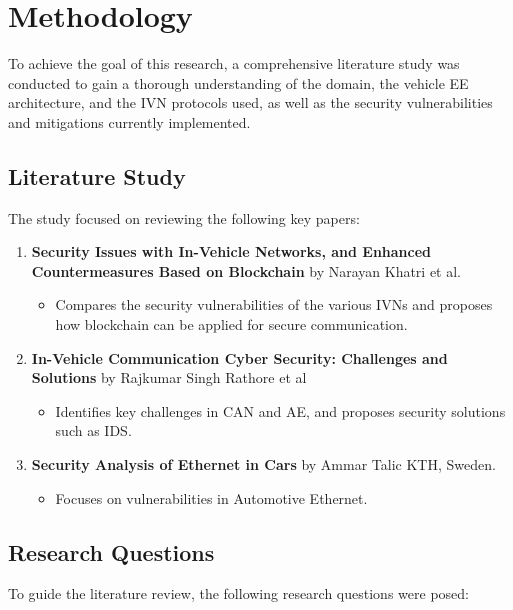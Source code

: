 \documentclass{report}
\begin{document}
\section{Methodology}
To achieve the goal of this research, a comprehensive literature study was conducted to gain a thorough understanding of the domain, the vehicle EE architecture, and the IVN protocols used, as well as the security vulnerabilities and mitigations currently implemented.

\subsection{Literature Study}
The study focused on reviewing the following key papers:

\begin{enumerate}
    \item \textbf{Security Issues with In-Vehicle Networks, and Enhanced Countermeasures Based on Blockchain} by Narayan Khatri et al.
    \begin{itemize}
        \item Compares the security vulnerabilities of the various IVNs and proposes how blockchain can be applied for secure communication.
    \end{itemize}
    \item \textbf{In-Vehicle Communication Cyber Security: Challenges and Solutions} by Rajkumar Singh Rathore et al
    \begin{itemize}
        \item Identifies key challenges in CAN and AE, and proposes security solutions such as IDS.
    \end{itemize}
    \item \textbf{Security Analysis of Ethernet in Cars} by Ammar Talic KTH, Sweden.
    \begin{itemize}
        \item Focuses on vulnerabilities in Automotive Ethernet.
    \end{itemize}
\end{enumerate}

\subsection{Research Questions}
To guide the literature review, the following research questions were posed:
\end{document}
